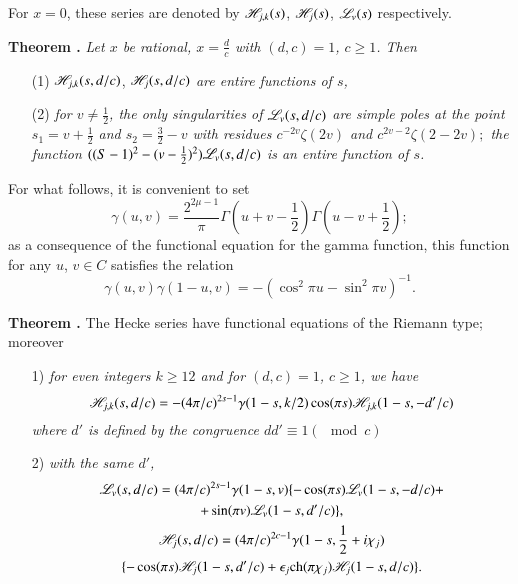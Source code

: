 For $x =0$, these series are denoted by $\mathscr{H}_{j,k} (s)$, $\mathscr{H}_j(s)$, $\mathscr{L}_v(s)$ respectively.

\medskip
\noindent
{\bfseries Theorem .\label{art7-thm7}}
\textit{Let $x$ be rational, $x =\frac{d}{c}$ with $(d,c) =1$, $c \geqslant 1$. Then }
\begin{enumerate}
\item[(1)] $\mathscr{H}_{j,k} (s, d/c)$, $\mathscr{H}_j(s, d/c)$ \textit{ are entire functions of $s$,}

\item[(2)] \textit{for $v \neq \frac{1}{2}$, the only singularities of $\mathscr{L}_v (s, d/c)$ are simple poles at the point $s_1 = v+\frac{1}{2}$ and $s_2 = \frac{3}{2}-v$ with residues $c^{-2v} \zeta(2v)$ and $c^{2v-2} \zeta(2-2v);$ the function $((S-1)^2 -(v-\frac{1}{2})^2) \mathscr{L}_v(s, d/c)$ is an entire function of $s$.}       
\end{enumerate}
 
For what follows, it is convenient to set
\begin{equation}
\gamma (u, v) = \frac{2^{2\mu-1}}{\pi} \Gamma (u+ v - \frac{1}{2}) \Gamma (u -v + \frac{1}{2}); 
\label{art7-eq1.48}
\end{equation}
as a consequence of the functional equation for the gamma function, this function for any $u$, $v \in C$ satisfies the relation
\begin{equation}
\gamma (u,v) \gamma (1-u, v) = - (\cos^2 \pi u - \sin^2 \pi v)^{-1} . \label{art7-eq1.49}
\end{equation}

\medskip
\noindent
{\bfseries Theorem .\label{art7-thm8}} The Hecke series have functional equations of the Riemann type; moreover
\begin{enumerate}
\item[1)] \textit{for even integers $k \geqslant 12$ and for $(d,c) =1$, $c \geqslant 1$, we have}
\begin{equation}
\mathscr{H}_{j,k} (s, d/c) = - (4\pi /c)^{2s-1} \gamma (1-s, k/2) \cos (\pi s) \mathscr{H}_{j,k} (1-s, -d'/c)
\label{art7-eq1.50}
\end{equation}
\textit{where $d'$ is defined by the congruence $dd' \equiv 1 (\mod c)$}

\item[2)] \textit{with the same $d'$,}
\begin{gather}
\mathscr{L}_v (s, d/c) = (4\pi /c)^{2s-1} \gamma (1-s, v) \{-\cos (\pi s) \mathscr{L}_v(1-s, -d/c) +\label{art7-eq1.51} \\
+ \sin (\pi v) \mathscr{L}_v (1-s, d'/c) \}, \notag\\
\mathscr{H}_j(s, d/c) = (4\pi/c)^{2c-1} \gamma (1-s,\frac{1}{2} + i\chi_j)  \label{art7-eq1.52}\\
\{-\cos (\pi s) \mathscr{H}_j(1-s, d'/c) + \epsilon_j \text{ch} (\pi \chi_j) \mathscr{H}_j (1-s, d/c)\}. \notag
\end{gather}\pageoriginale
\end{enumerate}

